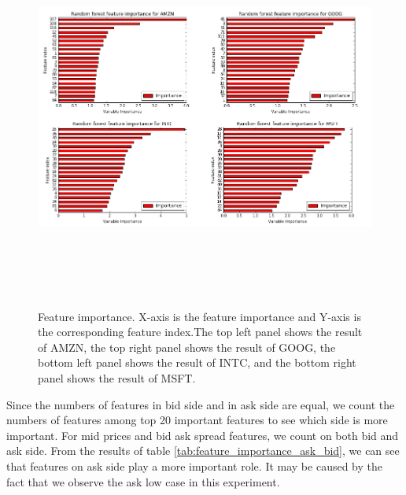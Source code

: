 \begin{figure} [hp]
  \begin{center}
    \includegraphics[width=6in,  height=5in]{figures/feature_importance.png}
  \end{center}
\caption{Feature importance. X-axis is the feature importance and Y-axis is the corresponding feature index.The top left panel shows the result of AMZN,   the top right panel shows the result of GOOG,  the bottom left panel shows the result of INTC,   and the bottom right panel shows the result of MSFT. } \label{fig:feature_importance}

\end{figure}
Since the numbers of features in bid side and in ask side are equal, we count the numbers of features among top 20 important features to see which side is more important. For mid prices and bid ask spread features, we count on both bid and ask side. From the results of table \ref{tab:feature_importance_ask_bid}, we can see that features on ask side play a more important role. It may be caused by the fact that we observe the ask low case in this experiment. 
	\begin{table}[hp]
		\caption{Ratio of features on bid and ask side }
		\begin{center}
		\end{center}
	\end{table}

